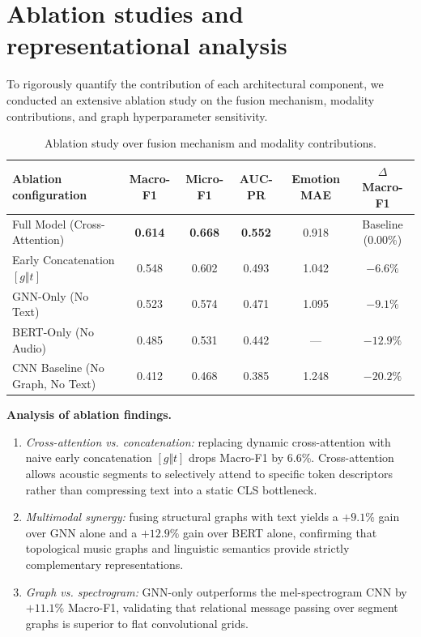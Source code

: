 \documentclass[10pt]{article}
\begin{document}
\section{Ablation studies and representational analysis}

To rigorously quantify the contribution of each architectural component, we conducted an extensive ablation study on the fusion mechanism, modality contributions, and graph hyperparameter sensitivity.

\begin{table}[t]
  \caption{Ablation study over fusion mechanism and modality contributions.}
  \label{tab:ablation}
  \centering
  \begin{tabular}{lccccc}
    \toprule
    Ablation configuration & Macro-F1 & Micro-F1 & AUC-PR & Emotion MAE & $\Delta$ Macro-F1 \\
    \midrule
    Full Model (Cross-Attention)       & \textbf{0.614} & \textbf{0.668} & \textbf{0.552} & 0.918 & Baseline (0.00\%) \\
    Early Concatenation $[g \Vert t]$  & 0.548 & 0.602 & 0.493 & 1.042 & $-6.6\%$ \\
    GNN-Only (No Text)                 & 0.523 & 0.574 & 0.471 & 1.095 & $-9.1\%$ \\
    BERT-Only (No Audio)               & 0.485 & 0.531 & 0.442 & ---   & $-12.9\%$ \\
    CNN Baseline (No Graph, No Text)   & 0.412 & 0.468 & 0.385 & 1.248 & $-20.2\%$ \\
    \bottomrule
  \end{tabular}
\end{table}

\textbf{Analysis of ablation findings.}
\begin{enumerate}[nosep]
  \item \textit{Cross-attention vs. concatenation:} replacing dynamic cross-attention with naive early concatenation $[g \Vert t]$ drops Macro-F1 by 6.6\%. Cross-attention allows acoustic segments to selectively attend to specific token descriptors rather than compressing text into a static CLS bottleneck.
  \item \textit{Multimodal synergy:} fusing structural graphs with text yields a $+9.1\%$ gain over GNN alone and a $+12.9\%$ gain over BERT alone, confirming that topological music graphs and linguistic semantics provide strictly complementary representations.
  \item \textit{Graph vs. spectrogram:} GNN-only outperforms the mel-spectrogram CNN by $+11.1\%$ Macro-F1, validating that relational message passing over segment graphs is superior to flat convolutional grids.
\end{enumerate}
\end{document}
